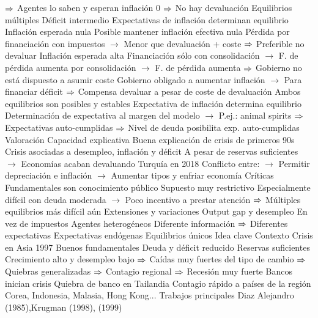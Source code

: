 \documentclass{nuevotema}
\begin{document}
\begin{esquemal}
				\4[] $\then$ Agentes lo saben y esperan inflación 0
				\4[] $\then$ No hay devaluación
			\3 Equilibrios múltiples
				\4 Déficit intermedio
				\4 Expectativas de inflación determinan equilibrio
				\4 Inflación esperada nula
				\4[] Posible mantener inflación efectiva nula
				\4[] Pérdida por financiación con impuestos
				\4[] $\to$ Menor que devaluación + coste
				\4[] $\then$ Preferible no devaluar
				\4 Inflación esperada alta
				\4[] Financiación sólo con consolidación
				\4[] $\to$ F. de pérdida aumenta por consolidación
				\4[] $\to$ F. de pérdida aumenta
				\4[] $\then$ Gobierno no está dispuesto a asumir coste
				\4[] Gobierno obligado a aumentar inflación
				\4[] $\to$ Para financiar déficit
				\4[] $\then$ Compensa devaluar a pesar de coste de devaluación
				\4[$\then$] Ambos equilibrios son posibles y estables
				\4[] Expectativa de inflación determina equilibrio
				\4[] Determinación de expectativa al margen del modelo
				\4[] $\to$ P.ej.: animal spirits
				\4[] $\then$ Expectativas auto-cumplidas
				\4[] $\then$ Nivel de deuda posibilita exp. auto-cumplidas
		\2 Valoración
			\3 Capacidad explicativa
				\4 Buena explicación de crisis de primeros 90s
				\4 Crisis asociadas a desempleo, inflación y déficit
				\4[] A pesar de reservas suficientes
				\4[] $\to$ Economías acaban devaluando
				\4 Turquía en 2018
				\4[] Conflicto entre:
				\4[] $\to$ Permitir depreciación e inflación
				\4[] $\to$ Aumentar tipos y enfriar economía
			\3 Críticas
				\4 Fundamentales son conocimiento público
				\4[] Supuesto muy restrictivo
				\4[] Especialmente difícil con deuda moderada
				\4[] $\to$ Poco incentivo a prestar atención
				\4[] $\then$ Múltiples equilibrios más difícil aún
			\3 Extensiones y variaciones
				\4 Output gap y desempleo
				\4[] En vez de impuestos
				\4 Agentes heterogéneos
				\4[] Diferente información
				\4[] $\then$ Diferentes expectativas
				\4 Expectativas endógenas
				\4[] Equilibrios únicos
	\1 
		\2 Idea clave
			\3 Contexto
				\4 Crisis en Asia 1997
				\4[] Buenos fundamentales
				\4[] Deuda y déficit reducido
				\4[] Reservas suficientes
				\4[] Crecimiento alto y desempleo bajo
				\4[] $\then$ Caídas muy fuertes del tipo de cambio
				\4[] $\then$ Quiebras generalizadas
				\4[] $\then$ Contagio regional
				\4[] $\then$ Recesión muy fuerte
				\4 Bancos inician crisis
				\4[] Quiebra de banco en Tailandia
				\4 Contagio rápido a países de la región
				\4[] Corea, Indonesia, Malasia, Hong Kong...
				\4 Trabajos principales
				\4[] Diaz Alejandro (1985),Krugman (1998), (1999)

\end{esquemal}
\end{document}
